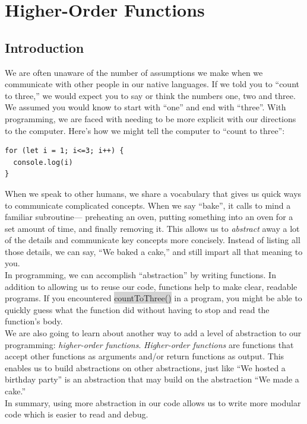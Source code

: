 \documentclass[11pt]{article}
\begin{document}
\newpage
\section{Higher-Order Functions}
\subsection{Introduction}
We are often unaware of the number of assumptions we make when we communicate with other people in our native languages. If we told you to “count to three,” we would expect you to say or think the numbers one, two and three. We assumed you would know to start with “one” and end with “three”. With programming, we are faced with needing to be more explicit with our directions to the computer. Here’s how we might tell the computer to “count to three”:
\begin{lstlisting}
for (let i = 1; i<=3; i++) {
  console.log(i)
}
\end{lstlisting}
When we speak to other humans, we share a vocabulary that gives us quick ways to communicate complicated concepts. When we say “bake”, it calls to mind a familiar subroutine— preheating an oven, putting something into an oven for a set amount of time, and finally removing it. This allows us to \textit{abstract} away a lot of the details and communicate key concepts more concisely. Instead of listing all those details, we can say, “We baked a cake,” and still impart all that meaning to you. \\
\newline
In programming, we can accomplish “abstraction” by writing functions. In addition to allowing us to reuse our code, functions help to make clear, readable programs. If you encountered \colorbox{lightgray}{countToThree()} in a program, you might be able to quickly guess what the function did without having to stop and read the function’s body. \\
\newline
We are also going to learn about another way to add a level of abstraction to our programming: \textit{higher-order functions}. \textit{Higher-order functions} are functions that accept other functions as arguments and/or return functions as output. This enables us to build abstractions on other abstractions, just like “We hosted a birthday party” is an abstraction that may build on the abstraction “We made a cake.” \\
\newline
In summary, using more abstraction in our code allows us to write more modular code which is easier to read and debug.
\end{document}
